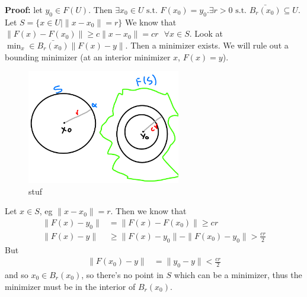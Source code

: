 \documentclass{article}
\newcommand*{\txt}[1]{\text{ #1 }}%
\newcommand*{\fora}{\txt{}\forall}%
\begin{document}
\textbf{Proof:} let $y_0\in F(U)$. Then $\exists x_0\in U\txt{s.t.} F(x_0)=y_0. \exists r>0\txt{s.t.}\bar{B_r(x_0)}\subseteq U$. Let $S=\{x\in U|\|x-x_0\|=r\}$ We know that $\|F(x)-F(x_0)\|\geq c\|x-x_0\|=cr\fora x\in S$. Look at $\min_x\in \bar{B_r(x_0)}\|F(x)-y\|$. Then a minimizer exists. We will rule out a bounding minimizer (at an interior minimizer $x$, $F(x)=y$).

\begin{figure}[H]
    \centering
    \includegraphics[height=5cm]{fig3.png}
    \caption{stuf}
    \label{fig:fig3}
\end{figure}

Let $x\in S$, eg $\|x-x_0\|=r$. Then we know that \begin{align*}
    \|F(x)-y_0\|&=\|F(x)-F(x_0)\|\geq cr\\
    \|F(x)-y\|&\geq \|F(x)-y_0\|-\|F(x_0)-y_0\|>\frac{cr}{2}
\end{align*}But \begin{align*}
    \|F(x_0)-y\|&=\|y_0-y\|<\frac{cr}{2}
\end{align*}and so $x_0\in B_r(x_0)$, so there's no point in $S$ which can be a minimizer, thus the minimizer must be in the interior of $B_r(x_0)$.
\end{document}
